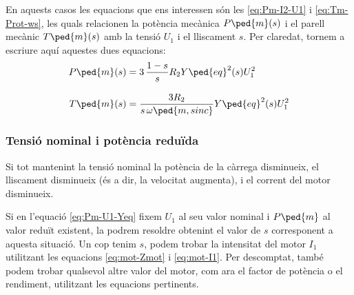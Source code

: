 En aquests casos les equacions que ens interessen són les \eqref{eq:Pm-I2-U1} i \eqref{eq:Tm-Prot-ws}, les quals relacionen la potència mecànica $P\ped{m}(s)$ i el parell mecànic $T\ped{m}(s)$ amb la tensió $U_1$ i el lliscament $s$. Per claredat, tornem a escriure aquí aquestes dues equacions:
\begin{subequations}
	\begin{align}
	P\ped{m}(s) &= 3 \,\frac{1-s}{s} R_2 Y\ped{eq}^2(s) U_1^2\label{eq:Pm-U1-Yeq} \\[2ex]
	T\ped{m}(s) &=\frac{3 R_2}{s\,\omega\ped{m,sinc}} Y\ped{eq}^2(s) U_1^2\label{eq:Tm-U1-Yeq}
	\end{align}
\end{subequations}

	
\subsubsection{Tensió nominal i potència reduïda}	

Si tot mantenint la tensió nominal la potència de la càrrega disminueix, el lliscament disminueix (és a dir, la velocitat augmenta), i el corrent del motor disminueix.
	
Si en l'equació \eqref{eq:Pm-U1-Yeq} fixem $U_1$ al seu valor nominal i  $P\ped{m}$ al  valor reduït existent,  la podrem resoldre obtenint el valor de $s$ corresponent  a aquesta situació. Un cop tenim $s$, podem trobar la intensitat del motor $I_1$ utilitzant les equacions \eqref{eq:mot-Zmot} i \eqref{eq:mot-I1}. Per descomptat, també podem trobar qualsevol altre valor del motor, com  ara el factor de potència o el rendiment, utilitzant les equacions pertinents.


